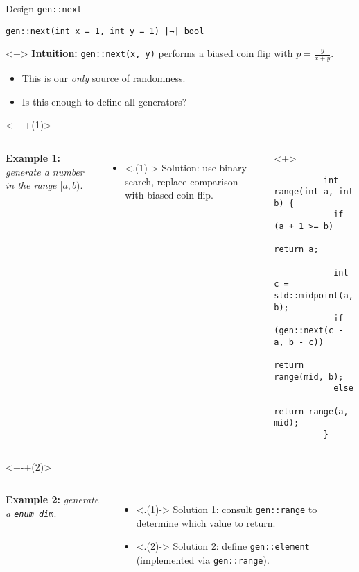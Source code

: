 \begin{frame}[fragile,t]{\halcheck{} \textemdash{} Design \textemdash{} \texttt{gen::next}}
  \begin{center}
    \texttt{gen::next(int x = 1, int y = 1) |→| bool}
  \end{center}

  \begin{onlyenv}<+>
    \textbf{Intuition:} \texttt{gen::next(x, y)} performs a biased coin flip with \( p = \frac{y}{x + y} \).

    \begin{itemize}
      \item This is our \emph{only} source of randomness.
      \item Is this enough to define all generators?
    \end{itemize}
  \end{onlyenv}

  \begin{onlyenv}<+-+(1)>
    \begin{columns}[T]
      \textbf{Example 1:} \emph{generate a number in the range $[a, b)$}.

      \begin{itemize}
        \item<.(1)-> Solution: use binary search, replace comparison with biased coin flip.
      \end{itemize}

      \begin{onlyenv}<+>
        \begin{verbatim}
          int range(int a, int b) {
            if (a + 1 >= b)
              return a;

            int c = std::midpoint(a, b);
            if (gen::next(c - a, b - c))
              return range(mid, b);
            else
              return range(a, mid);
          }
        \end{verbatim}
      \end{onlyenv}
    \end{columns}
  \end{onlyenv}

  \begin{onlyenv}<+-+(2)>
    \begin{columns}[T]
      \textbf{Example 2:} \emph{generate a \texttt{enum dim}}.

      \begin{itemize}
        \item<.(1)-> Solution 1: consult \texttt{gen::range} to determine which value to return.
        \item<.(2)-> Solution 2: define \texttt{gen::element} (implemented via \texttt{gen::range}).
      \end{itemize}


\end{columns}
\end{onlyenv}
\end{frame}
